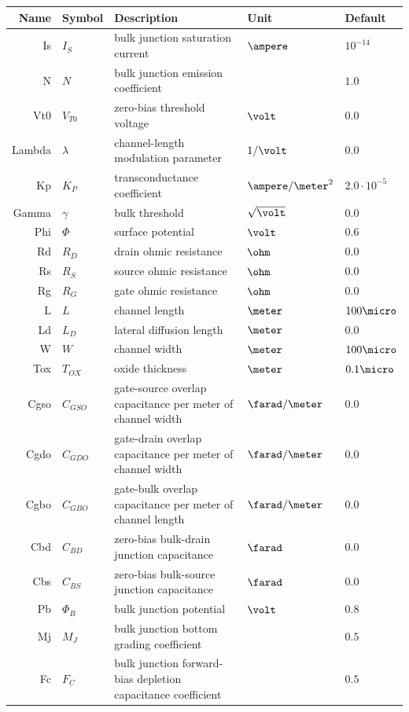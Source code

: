 \documentclass[10pt]{report}
\begin{document}
\begin{tabular}{rllll}
Name & Symbol & Description & Unit & Default\\
\hline
Is & $I_{S}$ & bulk junction saturation current & $\ampere$ & $10^{-14}$\\
N & $N$ & bulk junction emission coefficient &  & $1.0$\\
Vt0 & $V_{T0}$ & zero-bias threshold voltage & $\volt$ & $0.0$\\
Lambda & $\lambda$ & channel-length modulation parameter & $1/\volt$ & $0.0$\\
Kp & $K_P$ & transconductance coefficient & $\ampere/\meter^2$ & $2.0\cdot 10^{-5}$\\
Gamma & $\gamma$ & bulk threshold & $\sqrt{\volt}$ & $0.0$\\
Phi & $\Phi$ & surface potential & $\volt$ & $0.6$\\
Rd & $R_D$ & drain ohmic resistance & $\ohm$ & $0.0$\\
Rs & $R_S$ & source ohmic resistance & $\ohm$ & $0.0$\\
Rg & $R_G$ & gate ohmic resistance & $\ohm$ & $0.0$\\
L & $L$ & channel length & $\meter$ & $100\micro$\\
Ld & $L_D$ & lateral diffusion length & $\meter$ & $0.0$\\
W & $W$ & channel width & $\meter$ & $100\micro$\\
Tox & $T_{OX}$ & oxide thickness & $\meter$ & $0.1\micro$\\
Cgso & $C_{GSO}$ & \parbox[t]{6.5cm}{gate-source overlap capacitance per meter of channel width} & $\farad/\meter$ & $0.0$\\
Cgdo & $C_{GDO}$ & \parbox[t]{6.5cm}{gate-drain overlap capacitance per meter of channel width} & $\farad/\meter$ & $0.0$\\
Cgbo & $C_{GBO}$ & \parbox[t]{6.5cm}{gate-bulk overlap capacitance per meter of channel length} & $\farad/\meter$ & $0.0$\\
Cbd & $C_{BD}$ & zero-bias bulk-drain junction capacitance & $\farad$ & $0.0$\\
Cbs & $C_{BS}$ & zero-bias bulk-source junction capacitance & $\farad$ & $0.0$\\
Pb & $\Phi_{B}$ & bulk junction potential & $\volt$ & $0.8$\\
Mj & $M_J$ & bulk junction bottom grading coefficient & & $0.5$\\
Fc & $F_C$ & \parbox[t]{6.5cm}{bulk junction forward-bias depletion capacitance coefficient} & & $0.5$\\

\end{tabular}
\end{document}
